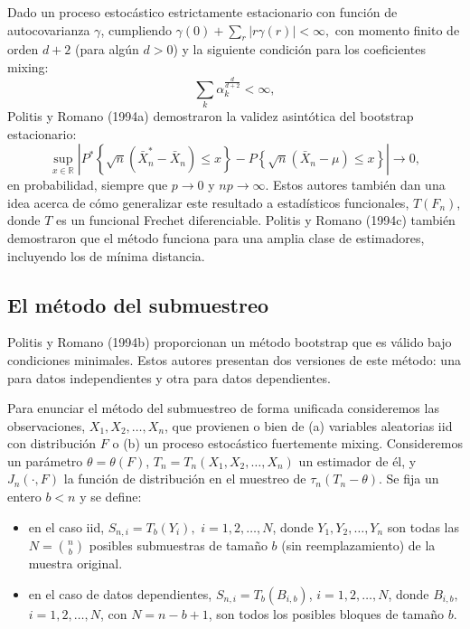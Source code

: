 \documentclass[
]{book}
\theoremstyle{break}
\theoremstyle{nonumberplain}
\begin{document}
Dado un proceso estocástico estrictamente estacionario con función de
autocovarianza \(\gamma\), cumpliendo \(\gamma (0)+\sum_{r}\left\vert
r\gamma (r)\right\vert <\infty ,\) con momento finito de orden \(d+2\)
(para algún \(d>0\)) y la siguiente condición para los coeficientes
mixing: \[\sum_{k}\alpha _{k}^{\frac{d}{d+2}}<\infty ,\]Politis y Romano
(1994a) demostraron la validez asintótica del bootstrap estacionario:
\[\sup_{x\in \mathbb{R}}\left\vert P^{\ast}\left\{ \sqrt{n}(\bar{X}_n^{\ast
}-\bar{X}_n)\leq x\right\} -P\left\{ \sqrt{n}(\bar{X}_n-\mu )\leq
x\right\} \right\vert \rightarrow 0,\]en probabilidad, siempre que
\(p\rightarrow 0\) y \(np\rightarrow \infty\). Estos autores también dan
una idea acerca de cómo generalizar este resultado a estadísticos
funcionales, \(T(F_n)\), donde \(T\) es un funcional Frechet
diferenciable. Politis y Romano (1994c) también demostraron que el
método funciona para una amplia clase de estimadores, incluyendo los de
mínima distancia.

\subsection{El método del submuestreo}\label{el-muxe9todo-del-submuestreo}

Politis y Romano (1994b) proporcionan un método bootstrap que es válido
bajo condiciones minimales. Estos autores presentan dos versiones de
este método: una para datos independientes y otra para datos
dependientes.

Para enunciar el método del submuestreo de forma unificada consideremos
las observaciones, \(X_1,X_2,\ldots ,X_n\), que provienen o bien de
(a) variables aleatorias iid con distribución \(F\) o (b) un proceso
estocástico fuertemente mixing. Consideremos un parámetro
\(\theta =\theta (F)\), \(T_n=T_n(X_1,X_2,\ldots ,X_n)\) un
estimador de él, y \(J_n(\cdot ,F)\) la función de distribución en el
muestreo de \(\tau _n(T_n-\theta )\). Se fija un entero \(b<n\) y se
define:

\begin{itemize}
\item
  en el caso iid, \(S_{n,i}=T_{b}(Y_i),\) \(i=1,2,\ldots ,N\), donde
  \(Y_1,Y_2,\ldots ,Y_n\) son todas las \(N=\binom{n}{b}\) posibles
  submuestras de tamaño \(b\) (sin reemplazamiento) de la muestra
  original.
\item
  en el caso de datos dependientes, \(S_{n,i}=T_{b}(B_{i,b})\),
  \(i=1,2,\ldots ,N\), donde \(B_{i,b},\) \(i=1,2,\ldots ,N\), con \(N=n-b+1\),
  son todos los posibles bloques de tamaño \(b\).
\end{itemize}
\end{document}
